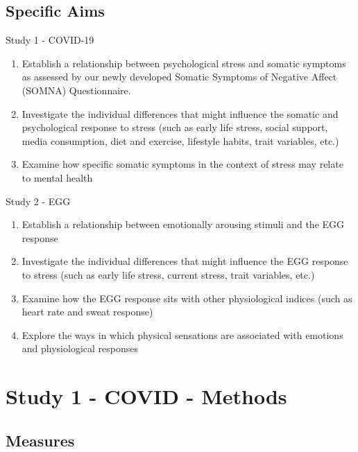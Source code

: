 \documentclass[]{book}
\providecommand{\tightlist}{%
  \setlength{\itemsep}{0pt}\setlength{\parskip}{0pt}}
\begin{document}
\hypertarget{specific-aims}{%
\section{Specific Aims}\label{specific-aims}}

Study 1 - COVID-19

\begin{enumerate}
\def\labelenumi{\arabic{enumi}.}
\tightlist
\item
  Establish a relationship between psychological stress and somatic symptoms as assessed by our newly developed Somatic Symptoms of Negative Affect (SOMNA) Questionnaire.
\item
  Investigate the individual differences that might influence the somatic and psychological response to stress (such as early life stress, social support, media consumption, diet and exercise, lifestyle habits, trait variables, etc.)
\item
  Examine how specific somatic symptoms in the context of stress may relate to mental health
\end{enumerate}

Study 2 - EGG

\begin{enumerate}
\def\labelenumi{\arabic{enumi}.}
\tightlist
\item
  Establish a relationship between emotionally arousing stimuli and the EGG response
\item
  Investigate the individual differences that might influence the EGG response to stress (such as early life stress, current stress, trait variables, etc.)
\item
  Examine how the EGG response sits with other physiological indices (such as heart rate and sweat response)
\item
  Explore the ways in which physical sensations are associated with emotions and physiological responses
\end{enumerate}

\hypertarget{study-1---covid---methods}{%
\chapter{Study 1 - COVID - Methods}\label{study-1---covid---methods}}

\hypertarget{measures}{%
\section{Measures}\label{measures}}
\end{document}

